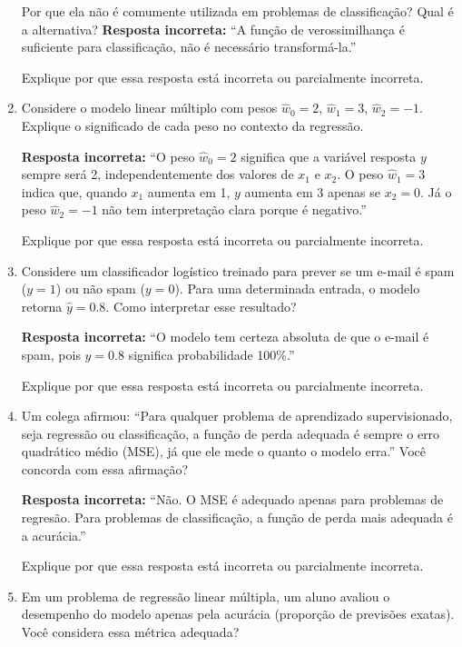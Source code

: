 \documentclass[12pt]{article}
\begin{document}
\begin{enumerate}
    Por que ela não é comumente utilizada em problemas de classificação? Qual é a alternativa?  
    \textbf{Resposta incorreta:}  
    “A função de verossimilhança é suficiente para classificação, não é necessário transformá-la.”

    Explique por que essa resposta está incorreta ou parcialmente incorreta.

    \item Considere o modelo linear múltiplo com pesos \(\hat{w}_0 = 2\), \(\hat{w}_1 = 3\), \(\hat{w}_2 = -1\).  
    Explique o significado de cada peso no contexto da regressão.  

    \textbf{Resposta incorreta:}  
    “O peso \(\hat{w}_0 = 2\) significa que a variável resposta \(y\) sempre será 2, independentemente dos valores de \(x_1\) e \(x_2\).  
    O peso \(\hat{w}_1 = 3\) indica que, quando \(x_1\) aumenta em 1, \(y\) aumenta em 3 apenas se \(x_2 = 0\).  
    Já o peso \(\hat{w}_2 = -1\) não tem interpretação clara porque é negativo.”  

    Explique por que essa resposta está incorreta ou parcialmente incorreta.  



    \item Considere um classificador logístico treinado para prever se um e-mail é spam (\(y=1\)) ou não spam (\(y=0\)).  
    Para uma determinada entrada, o modelo retorna \(\hat{y} = 0.8\).  
    Como interpretar esse resultado?  

    \textbf{Resposta incorreta:}  
    “O modelo tem certeza absoluta de que o e-mail é spam, pois \(\hat{y} = 0.8\) significa probabilidade 100\%.”  

    Explique por que essa resposta está incorreta ou parcialmente incorreta.  

    \item Um colega afirmou:  
    “Para qualquer problema de aprendizado supervisionado, seja regressão ou classificação, a função de perda adequada é sempre o erro quadrático médio (MSE), já que ele mede o quanto o modelo erra.”  
    Você concorda com essa afirmação?  

    \textbf{Resposta incorreta:}  
    “Não. O MSE é adequado apenas para problemas de regresão. Para problemas de classificação, a função de perda mais adequada é a acurácia.”  

    Explique por que essa resposta está incorreta ou parcialmente incorreta.  

    \item Em um problema de regressão linear múltipla, um aluno avaliou o desempenho do modelo apenas pela acurácia (proporção de previsões exatas).  
    Você considera essa métrica adequada?  


\end{enumerate}
\end{document}
